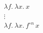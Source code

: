 \documentclass{article}
\begin{document}
\begin{center}
	{\Large
		$\lambda f.\ \lambda x.\ x$\\[0.4em]
		$\vdots$\\[0.4em]
		$\lambda f.\ \lambda x.\ f^{\circ n}\, x$
	}
\end{center}
\end{document}
